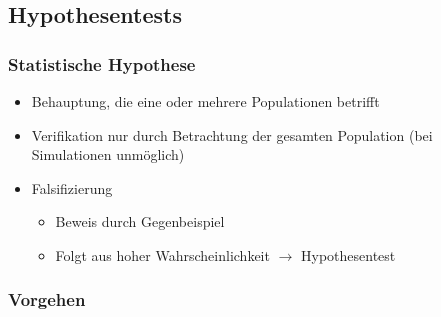 \documentclass[nonacm=true, language=german]{acmart}
\begin{document}
\newpage

\subsection{Hypothesentests}

\subsubsection{Statistische Hypothese}

\begin{itemize}
    \item Behauptung, die eine oder mehrere Populationen betrifft
    \item Verifikation nur durch Betrachtung der gesamten Population (bei Simulationen unmöglich)
    \item Falsifizierung
    \begin{itemize}
        \item Beweis durch Gegenbeispiel
        \item Folgt aus hoher Wahrscheinlichkeit $\rightarrow$ Hypothesentest
    \end{itemize}
\end{itemize}

\subsubsection{Vorgehen}
\end{document}
